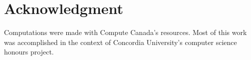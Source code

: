 \documentclass[conference]{IEEEtran}
\begin{document}
\section*{Acknowledgment}

Computations were made with Compute Canada's resources. Most of this work was accomplished in the context of Concordia University's computer science honours project.




\vspace{12pt}
\end{document}
